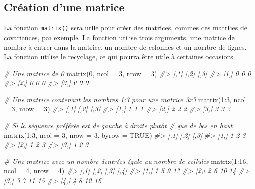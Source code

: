 \documentclass[
]{book}
\newenvironment{Shaded}{}{}
\newcommand{\AttributeTok}[1]{#1}
\newcommand{\CommentTok}[1]{\textit{#1}}
\newcommand{\ConstantTok}[1]{#1}
\newcommand{\DecValTok}[1]{#1}
\newcommand{\FunctionTok}[1]{#1}
\newcommand{\NormalTok}[1]{#1}
\newcommand{\SpecialCharTok}[1]{#1}
\begin{document}
\hypertarget{cruxe9ation-dune-matrice}{%
\subsection{Création d'une matrice}\label{cruxe9ation-dune-matrice}}

La fonction \texttt{matrix()} sera utile pour créer des matrices, commes des matrices de covariances, par exemple. La fonction utilise trois arguments, une matrice de nombre à entrer dans la matrice, un nombre de colonnes et un nombre de lignes. La fonction utilise le recyclage, ce qui pourra être utile à certaines occasions.

\begin{Shaded}
\begin{Highlighting}[]
\CommentTok{\# Une matrice de 0}
\FunctionTok{matrix}\NormalTok{(}\DecValTok{0}\NormalTok{, }\AttributeTok{ncol =} \DecValTok{3}\NormalTok{, }\AttributeTok{nrow =} \DecValTok{3}\NormalTok{)}
\CommentTok{\#\textgreater{}      [,1] [,2] [,3]}
\CommentTok{\#\textgreater{} [1,]    0    0    0}
\CommentTok{\#\textgreater{} [2,]    0    0    0}
\CommentTok{\#\textgreater{} [3,]    0    0    0}

\CommentTok{\# Une matrice contenant les nombres 1:3 pour une matrice 3x3}
\FunctionTok{matrix}\NormalTok{(}\DecValTok{1}\SpecialCharTok{:}\DecValTok{3}\NormalTok{, }\AttributeTok{ncol =} \DecValTok{3}\NormalTok{, }\AttributeTok{nrow =} \DecValTok{3}\NormalTok{)}
\CommentTok{\#\textgreater{}      [,1] [,2] [,3]}
\CommentTok{\#\textgreater{} [1,]    1    1    1}
\CommentTok{\#\textgreater{} [2,]    2    2    2}
\CommentTok{\#\textgreater{} [3,]    3    3    3}

\CommentTok{\# Si la séquence préférée est de gauche à droite plutôt}
\CommentTok{\# que de bas en haut}
\FunctionTok{matrix}\NormalTok{(}\DecValTok{1}\SpecialCharTok{:}\DecValTok{3}\NormalTok{, }\AttributeTok{ncol =} \DecValTok{3}\NormalTok{, }\AttributeTok{nrow =} \DecValTok{3}\NormalTok{, }\AttributeTok{byrow =} \ConstantTok{TRUE}\NormalTok{)}
\CommentTok{\#\textgreater{}      [,1] [,2] [,3]}
\CommentTok{\#\textgreater{} [1,]    1    2    3}
\CommentTok{\#\textgreater{} [2,]    1    2    3}
\CommentTok{\#\textgreater{} [3,]    1    2    3}

\CommentTok{\# Une matrice avec un nombre d\textquotesingle{}entrées égale au nombre de cellules}
\FunctionTok{matrix}\NormalTok{(}\DecValTok{1}\SpecialCharTok{:}\DecValTok{16}\NormalTok{, }\AttributeTok{ncol =} \DecValTok{4}\NormalTok{, }\AttributeTok{nrow =} \DecValTok{4}\NormalTok{)}
\CommentTok{\#\textgreater{}      [,1] [,2] [,3] [,4]}
\CommentTok{\#\textgreater{} [1,]    1    5    9   13}
\CommentTok{\#\textgreater{} [2,]    2    6   10   14}
\CommentTok{\#\textgreater{} [3,]    3    7   11   15}
\CommentTok{\#\textgreater{} [4,]    4    8   12   16}
\end{Highlighting}
\end{Shaded}
\end{document}

